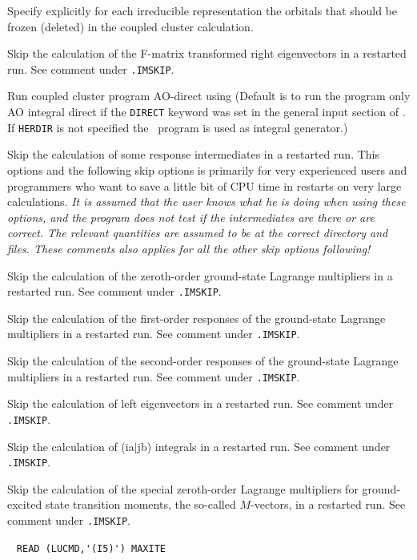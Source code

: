 \begin{description}
    Specify explicitly for each irreducible representation the
    orbitals that should be frozen (deleted) in the coupled cluster
    calculation.
 
\item[\Key{FRSKIP}] 
   Skip the calculation of the F-matrix transformed right eigenvectors
   in a restarted run. See comment under \verb|.IMSKIP|.
%
\item[\Key{HERDIR}] 
       Run coupled cluster program AO-direct
       using {\her}
       (Default is to run the program only AO integral direct
       if the \verb+DIRECT+ keyword was set in the general
       input section of \dalton . If \verb+HERDIR+ is not specified the \eri\
       program is used as integral generator.) 
%
\item[\Key{IMSKIP}] 
   Skip the calculation of some response intermediates in a restarted run.
   This options and the following skip options is primarily for very experienced users 
   and programmers who want to save a little bit of CPU time in restarts on very large 
   calculations. 
   {\em It is assumed that the user knows what he is doing when using these options, and
   the program does not test if the intermediates are there or are correct. 
   The relevant quantities are assumed to be at the correct directory and files.
   These comments also applies for all the other skip options following! }
%
\item[\Key{L0SKIP}]  
   Skip the calculation of the zeroth-order ground-state Lagrange
   multipliers in a restarted run. See comment under \verb|.IMSKIP|.
%
\item[\Key{L1SKIP}] 
   Skip the calculation of the first-order responses of the 
   ground-state Lagrange multipliers in a restarted run. See comment under \verb|.IMSKIP|.
%
\item[\Key{L2SKIP}]  
   Skip the calculation of the second-order responses of the 
   ground-state Lagrange multipliers in a restarted run. See comment under \verb|.IMSKIP|.
%
\item[\Key{LESKIP}]  
   Skip the calculation of left eigenvectors
   in a restarted run. See comment under \verb|.IMSKIP|.
%
\item[\Key{LISKIP}] 
   Skip the calculation of (ia$\mid$jb) integrals in a restarted run. See comment under \verb|.IMSKIP|.
%
\item[\Key{M1SKIP}] 
   Skip the calculation of the special zeroth-order Lagrange 
   multipliers for ground-excited state transition moments,
   the so-called $M$-vectors, in a restarted run. See comment under \verb|.IMSKIP|.
%
\item[\Key{MAX IT}] \verb| |\newline
  \verb|READ (LUCMD,'(I5)') MAXITE|


\end{description}
